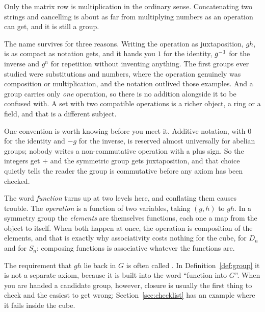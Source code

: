 Only the matrix row is multiplication in the ordinary sense. Concatenating two strings and
cancelling is about as far from multiplying numbers as an operation can get, and it is still a
group.

The name survives for three reasons. Writing the operation as juxtaposition, $gh$, is as compact as
notation gets, and it hands you $1$ for the identity, $g^{-1}$ for the inverse and $g^n$ for
repetition without inventing anything. The first groups ever studied were substitutions and
numbers, where the operation genuinely was composition or multiplication, and the notation outlived
those examples. And a group carries only \emph{one} operation, so there is no addition alongside it
to be confused with. A set with two compatible operations is a richer object, a ring or a field,
and that is a different subject.

One convention is worth knowing before you meet it. Additive notation, with $0$ for the identity
and $-g$ for the inverse, is reserved almost universally for abelian groups; nobody writes a
non-commutative operation with a plus sign. So the integers get $+$ and the symmetric group gets
juxtaposition, and that choice quietly tells the reader the group is commutative before any axiom
has been checked.


\begin{rem}
The word \emph{function} turns up at two levels here, and conflating them causes trouble. The
\emph{operation} is a function of two variables, taking $(g,h)$ to $gh$. In a symmetry group the
\emph{elements} are themselves functions, each one a map from the object to itself. When both
happen at once, the operation is composition of the elements, and that is exactly why associativity
costs nothing for the cube, for $D_n$ and for $S_n$: composing functions is associative whatever
the functions are.
\end{rem}

\begin{rem}
The requirement that $gh$ lie back in $G$ is often called . In
Definition~\ref{def:group} it is not a separate axiom, because it is built into the word
``function into $G$''. When you are handed a candidate group, however, closure is usually the
first thing to check and the easiest to get wrong; Section~\ref{sec:checklist} has an example
where it fails inside the cube.
\end{rem}

